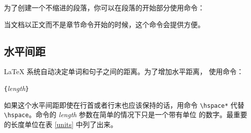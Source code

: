 为了创建一个不缩进的段落，你可以在段落的开始部分使用命令：
\begin{lscommand}
\end{lscommand}
当文档以正文而不是章节命令开始的时候，这个命令会提供方便。

\subsection{水平间距}
\label{sec:hspace}
\LaTeX{} 系统自动决定单词和句子之间的距离。为了增加水平距离，
使用命令：
\begin{lscommand}
\verb|{|\emph{length}\verb|}|
\end{lscommand}
如果这个水平间距即使在行首或者行末也应该保持的话，用命令 \verb|\hspace*| 代替 \verb|\hspace|。命令的 \emph{length} 参数在简单的情况下只是一个带有单位
的数字。最重要的长度单位在表 \ref{units} 中列了出来。

